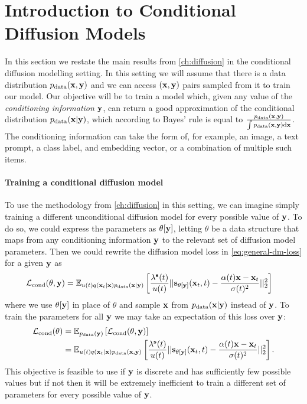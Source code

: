 \section{Introduction to Conditional Diffusion Models} \label{sec:conditional-diffusion-overview}

In this section we restate the main results from \cref{ch:diffusion} in the conditional diffusion modelling setting. In this setting we will assume that there is a data distribution $p_\text{data}({\mathbf{x}}, {\mathbf{y}})$ and we can access $({\mathbf{x}}, {\mathbf{y}})$ pairs sampled from it to train our model. Our objective will be to train a model which, given any value of the \textit{conditioning information} ${\mathbf{y}}$, can return a good approximation of the conditional distribution $p_\text{data}({\mathbf{x}}|{\mathbf{y}})$, which according to Bayes' rule is equal to $\frac{p_\text{data}({\mathbf{x}},{\mathbf{y}})}{\int p_\text{data}({\mathbf{x}},{\mathbf{y}}) \mathrm{d}{\mathbf{x}}}$. The conditioning information can take the form of, for example, an image, a text prompt, a class label, and embedding vector, or a combination of multiple such items.

\paragraph{Training a conditional diffusion model}
To use the methodology from \cref{ch:diffusion} in this setting, we can imagine simply training a different unconditional diffusion model for every possible value of ${\mathbf{y}}$. To do so, we could express the parameters as $\theta[{\mathbf{y}}]$, letting $\theta$ be a data structure that maps from any conditioning information ${\mathbf{y}}$ to the relevant set of diffusion model parameters. Then we could rewrite the diffusion model loss in \cref{eq:general-dm-loss} for a given ${\mathbf{y}}$ as
\begin{align} \label{eq:cond-diffusion-loss-single-y}
    \mathcal{L}_\text{cond}(\theta, {\mathbf{y}}) &= \mathbb{E}_{u(t)q({\mathbf{x}}_t|{\mathbf{x}})p_{\rm{data}}({\mathbf{x}}|{\mathbf{y}})} \left[ \frac{\lambda^{\mathbf{s}}(t)}{u(t)} 
    || {\mathbf{s}}_{\theta[{\mathbf{y}}]}({\mathbf{x}}_t, t) - \frac{\alpha(t){\mathbf{x}}-{\mathbf{x}}_t}{\sigma(t)^2} ||_2^2 \right]
\end{align}
where we use $\theta[{\mathbf{y}}]$ in place of $\theta$ and sample ${\mathbf{x}}$ from $p_{\rm{data}}({\mathbf{x}}|{\mathbf{y}})$ instead of ${\mathbf{y}}$. To train the parameters for all ${\mathbf{y}}$ we may take an expectation of this loss over ${\mathbf{y}}$:
\begin{align} \label{eq:cond-exp-diffusion-loss-all-sigma}
    {\mathcal{L}}_\text{cond}(\theta) &= \mathbb{E}_{p_{\rm{data}}({\mathbf{y}})} \left[ {\mathcal{L}}_\text{cond}(\theta, {\mathbf{y}}) \right] \\
    &= \mathbb{E}_{u(t)q({\mathbf{x}}_t|{\mathbf{x}})p_{\rm{data}}({\mathbf{x}}, {\mathbf{y}})} \left[ \frac{\lambda^{\mathbf{s}}(t)}{u(t)} 
    || {\mathbf{s}}_{\theta[{\mathbf{y}}]}({\mathbf{x}}_t, t) - \frac{\alpha(t){\mathbf{x}}-{\mathbf{x}}_t}{\sigma(t)^2} ||_2^2 \right].
\end{align}
This objective is feasible to use if ${\mathbf{y}}$ is discrete and has sufficiently few possible values but if not then it will be extremely inefficient to train a different set of parameters for every possible value of ${\mathbf{y}}$.

